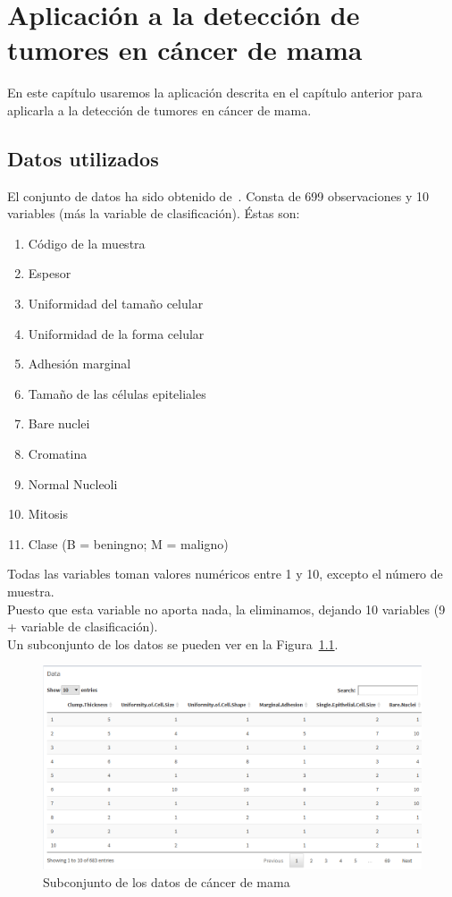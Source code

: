\chapter[Aplicación al cáncer de mama]{Aplicación a la detección de tumores en cáncer de mama}

En este capítulo usaremos la aplicación descrita en el capítulo anterior para aplicarla a la detección de tumores en cáncer de mama.

\section{Datos utilizados}

El conjunto de datos ha sido obtenido de~\cite{cancer}. Consta de 699 observaciones y 10 variables (más la variable de clasificación). Éstas son:

\begin{enumerate}
	\item Código de la muestra
	\item Espesor
	\item Uniformidad del tamaño celular
	\item Uniformidad de la forma celular
	\item Adhesión marginal
	\item Tamaño de las células epiteliales
	\item Bare nuclei
	\item Cromatina
	\item Normal Nucleoli
	\item Mitosis
	\item Clase (B = beningno; M = maligno)
\end{enumerate}

Todas las variables toman valores numéricos entre 1 y 10, excepto el número de muestra.\\

Puesto que esta variable no aporta nada, la eliminamos, dejando 10 variables (9 + variable de clasificación).\\

Un subconjunto de los datos se pueden ver en la Figura~\ref{fig:datos_cancer}.

\begin{figure}[tbph!]
\centering
\includegraphics[width=0.5\linewidth]{imagenes/cancer/datos.png}
\caption{Subconjunto de los datos de cáncer de mama}
\label{fig:datos_cancer}
\end{figure}

